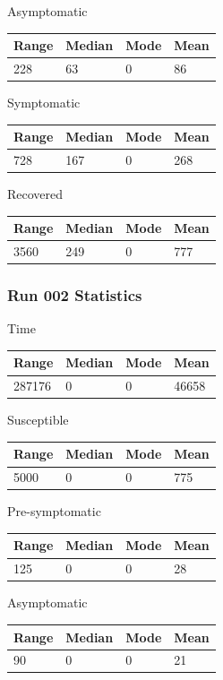 \documentclass{article}
\begin{document}
Asymptomatic
\newline
\begin{tabular}{| l | l | l | l |}
  \hline\hline
  Range & Median & Mode & Mean \\
  \hline
  228 & 63 & 0 & 86 \\
  \hline
\end{tabular} 

Symptomatic
\newline
\begin{tabular}{| l | l | l | l |}
  \hline\hline
  Range & Median & Mode & Mean \\
  \hline
  728 & 167 & 0 & 268 \\
  \hline
\end{tabular} 

Recovered
\newline
\begin{tabular}{| l | l | l | l |}
  \hline\hline
  Range & Median & Mode & Mean \\
  \hline
  3560 & 249 & 0 & 777 \\
  \hline
\end{tabular} 
\subsubsection{Run 002 Statistics}
Time
\newline
\begin{tabular}{| l | l | l | l |}
  \hline\hline
  Range & Median & Mode & Mean \\
  \hline
  287176 & 0 & 0 & 46658 \\
  \hline
\end{tabular} 

Susceptible
\newline
\begin{tabular}{| l | l | l | l |}
  \hline\hline
  Range & Median & Mode & Mean \\
  \hline
  5000 & 0 & 0 & 775 \\
  \hline
\end{tabular} 

Pre-symptomatic
\newline
\begin{tabular}{| l | l | l | l |}
  \hline\hline
  Range & Median & Mode & Mean \\
  \hline
  125 & 0 & 0 & 28 \\
  \hline
\end{tabular} 

Asymptomatic
\newline
\begin{tabular}{| l | l | l | l |}
  \hline\hline
  Range & Median & Mode & Mean \\
  \hline
  90 & 0 & 0 & 21 \\
  \hline
\end{tabular} 
\end{document}
